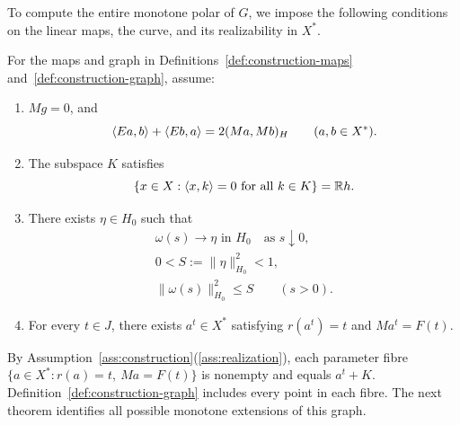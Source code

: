 To compute the entire monotone polar of $G$, we impose the following
conditions on the linear maps, the curve, and its realizability in $X^*$.
\begin{assumption}\label{ass:construction}
For the maps and graph in Definitions~\ref{def:construction-maps}
and~\ref{def:construction-graph}, assume:
\begin{enumerate}
\renewcommand{\theenumi}{H\arabic{enumi}}
\renewcommand{\labelenumi}{(\theenumi)}
\item\label{ass:bilinear} $Mg=0$, and
\begin{equation}
\langle Ea,b\rangle+\langle Eb,a\rangle=2(Ma,Mb)_H
\qquad(a,b\in X^*).
\label{eq:abs-bilinear}
\end{equation}

\item\label{ass:annihilator} The subspace $K$ satisfies
\begin{equation}
\{x\in X:\langle x,k\rangle=0\ \text{for all }k\in K\}=\mathbb R h.
\label{eq:abs-annihilator}
\end{equation}

\item\label{ass:curve-limit} There exists $\eta\in H_0$ such that
\begin{equation}
\begin{gathered}
\omega(s)\longrightarrow\eta\text{ in }H_0
\quad\text{as }s\downarrow0,\\
0<S:=\|\eta\|_{H_0}^2<1,\\
\|\omega(s)\|_{H_0}^2\le S\qquad(s>0).
\end{gathered}
\label{eq:abs-tail}
\end{equation}

\item\label{ass:realization} For every $t\in J$, there exists $a^t\in X^*$
satisfying $r(a^t)=t$ and $Ma^t=F(t)$.
\end{enumerate}
\end{assumption}
By Assumption~\ref{ass:construction}\textup{(\ref{ass:realization})}, each parameter fibre
$\{a\in X^*:r(a)=t,\ Ma=F(t)\}$ is nonempty and equals $a^t+K$.
Definition~\ref{def:construction-graph} includes every point in each fibre.
The next theorem identifies all possible monotone extensions of this graph. 

